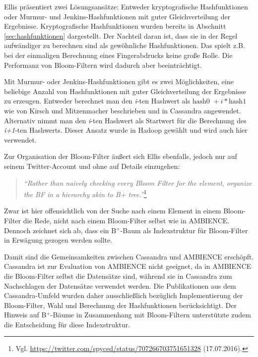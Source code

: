 Ellis präsentiert zwei Lösungsansätze: Entweder kryptografische Hashfunktionen oder Murmur- und Jenkins-Hashfunktionen mit guter Gleichverteilung der Ergebnisse. Kryptografische Hashfunktionen wurden bereits in Abschnitt \ref{sec:hashfunktionen} dargestellt. Der Nachteil daran ist, dass sie in der Regel aufwändiger zu berechnen sind als gewöhnliche Hashfunktionen. Das spielt z.B. bei der einmaligen Berechnung eines Fingerabdrucks keine große Rolle. Die Performanz von Bloom-Filtern wird dadurch aber beeinträchtigt. 

Mit Murmur- oder Jenkins-Hashfunktionen gibt es zwei Möglichkeiten, eine beliebige Anzahl von Hashfunktionen mit guter Gleichverteilung der Ergebnisse zu erzeugen. Entweder berechnet man den \textit{i}-ten Hashwert als $\text{hash0 }+ i\ast \text{hash1}$ wie von Kirsch und Mitzenmacher beschrieben und in Cassandra angewendet. Alternativ nimmt man den \textit{i}-ten Hashwert als Startwert für die Berechnung des \textit{i+1}-ten Hashwerts. Dieser Ansatz wurde in Hadoop gewählt und wird auch hier verwendet. 

Zur Organisation der Bloom-Filter äußert sich Ellis ebenfalls, jedoch nur auf seinem Twitter-Account und ohne auf Details einzugehen: 
\begin{quote}
\textit{"`Rather than naively checking every Bloom Filter for the element, organize the BF in a hierarchy akin to B+ tree."'}\footnote{Vgl. \url{https://twitter.com/spyced/status/707266703751651328} (17.07.2016).}
\end{quote}
Zwar ist hier offensichtlich von der Suche nach einem Element in einem Bloom-Filter die Rede, nicht nach einem Bloom-Filter selbst wie in AMBIENCE. Dennoch zeichnet sich ab, dass ein B$^+$-Baum als Indexstruktur für Bloom-Filter in Erwägung gezogen werden sollte. 

Damit sind die Gemeinsamkeiten zwischen Cassandra und AMBIENCE erschöpft. Cassandra ist zur Evaluation von AMBIENCE nicht geeignet, da in AMBIENCE die Bloom-Filter selbst die Datensätze sind, während sie in Cassandra zum Nachschlagen der Datensätze verwendet werden. Die Publikationen aus dem Cassandra-Umfeld wurden daher ausschließlich bezüglich Implementierung der Bloom-Filter, Wahl und Berechnung der Hashfunktionen berücksichtigt. Der Hinweis auf B$^+$-Bäume in Zusammenhang mit Bloom-Filtern unterstützte zudem die Entscheidung für diese Indexstruktur. 
